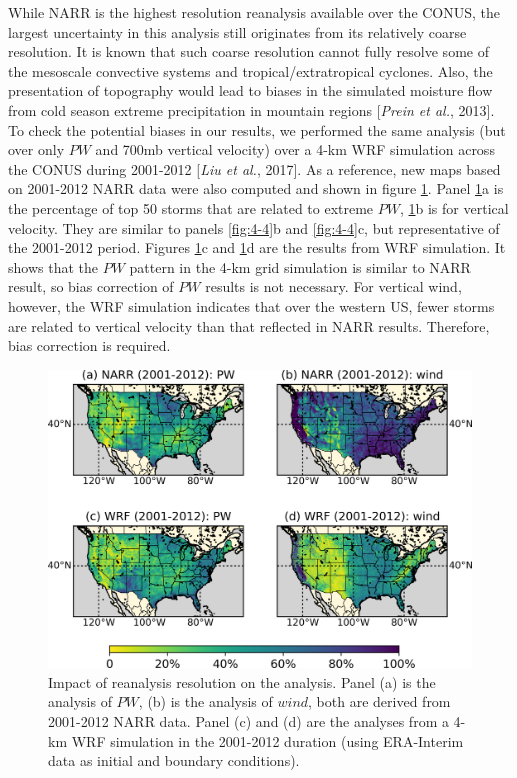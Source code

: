 While NARR is the highest resolution reanalysis available over the CONUS, the largest uncertainty in this analysis still originates from its relatively coarse resolution. It is known that such coarse resolution cannot fully resolve some of the mesoscale convective systems and tropical/extratropical cyclones. Also, the presentation of topography would lead to biases in the simulated moisture flow from cold season extreme precipitation in mountain regions [\textit{Prein et al.}, 2013]. To check the potential biases in our results, we performed the same analysis (but over only $PW$ and 700mb vertical velocity) over a 4-km WRF simulation across the CONUS during 2001-2012 [\textit{Liu et al.}, 2017]. As a reference, new maps based on 2001-2012 NARR data were also computed and shown in figure \ref{fig:4-9}. Panel \ref{fig:4-9}a is the percentage of top 50 storms that are related to extreme $PW$, \ref{fig:4-9}b is for vertical velocity. They are similar to panels \ref{fig:4-4}b and \ref{fig:4-4}c, but representative of the 2001-2012 period. Figures \ref{fig:4-9}c and \ref{fig:4-9}d are the results from WRF simulation. It shows that the $PW$ pattern in the 4-km grid simulation is similar to NARR result, so bias correction of $PW$ results is not necessary. For vertical wind, however, the WRF simulation indicates that over the western US, fewer storms are related to vertical velocity than that reflected in NARR results. Therefore, bias correction is required.

\begin{figure}[htbp]
	\includegraphics[width=\linewidth]{pics/ch4/fig9.png}
	\caption{Impact of reanalysis resolution on the analysis. Panel (a) is the analysis of $PW$, (b) is the analysis of $wind$, both are derived from 2001-2012 NARR data. Panel (c) and (d) are the analyses from a 4-km WRF simulation in the 2001-2012 duration (using ERA-Interim data as initial and boundary conditions).}
	\label{fig:4-9}
\end{figure}


